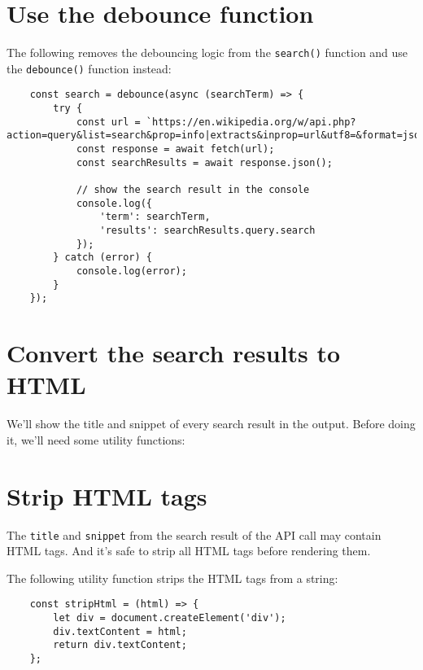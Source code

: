 \documentclass[11pt]{article}
\begin{document}
\section*{Use the debounce function}

The following removes the debouncing logic from the \verb|search()| function
and use the \verb|debounce()| function instead:

\begin{lstlisting}
    const search = debounce(async (searchTerm) => {
        try {
            const url = `https://en.wikipedia.org/w/api.php?action=query&list=search&prop=info|extracts&inprop=url&utf8=&format=json&origin=*&srlimit=10&srsearch=${searchTerm}`;
            const response = await fetch(url);
            const searchResults = await response.json();

            // show the search result in the console
            console.log({
                'term': searchTerm,
                'results': searchResults.query.search
            });
        } catch (error) {
            console.log(error);
        }
    });
\end{lstlisting}

\section*{Convert the search results to HTML}

We'll show the title and snippet of every search result in the output.
Before doing it, we'll need some utility functions:

\section*{Strip HTML tags}

The \verb|title| and \verb|snippet| from the search result of the API call may
contain HTML tags. And it's safe to strip all HTML tags
before rendering them.
\newline

\noindent
The following utility function strips the HTML tags from a string:

\begin{lstlisting}
    const stripHtml = (html) => {
        let div = document.createElement('div');
        div.textContent = html;
        return div.textContent;
    };
\end{lstlisting}
\end{document}
